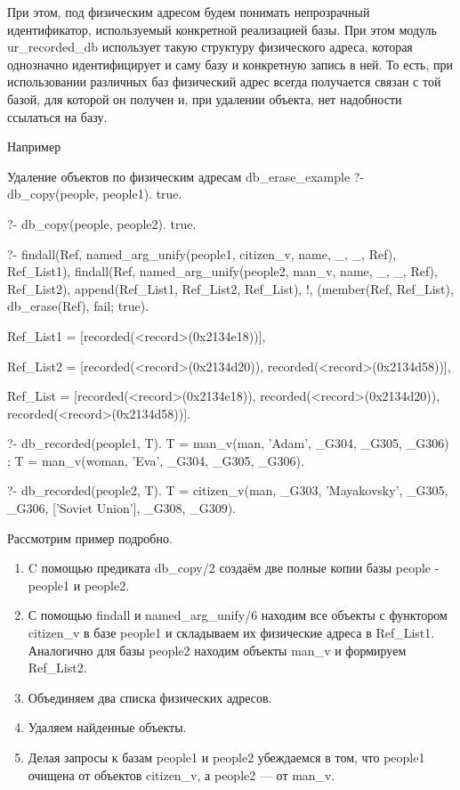 \documentclass[a4paper]{book}
\begin{document}
При этом, под физическим адресом будем понимать непрозрачный
идентификатор, используемый конкретной реализацией базы. При этом
модуль ur\_recorded\_db использует такую структуру физического
адреса, которая однозначно идентифицирует и саму базу и
конкретную запись в ней. То есть, при использовании различных баз
физический адрес всегда получается связан с той базой, для
которой он получен и, при удалении объекта, нет надобности
ссылаться на базу.

Например

\begin{bigexample}{Удаление объектов по физическим адресам}%
               {db_erase_example}
?- db_copy(people, people1).
true.

?- db_copy(people, people2).
true.

?- findall(Ref, 
           named_arg_unify(people1, citizen_v, name, _, _, Ref), 
           Ref_List1), 
   findall(Ref, 
           named_arg_unify(people2, man_v, name, _, _, Ref), 
           Ref_List2), 
   append(Ref_List1, Ref_List2, Ref_List), 
   !, 
   (member(Ref, Ref_List), db_erase(Ref), fail; true).

Ref_List1 = [recorded(<record>(0x2134e18))],

Ref_List2 = [recorded(<record>(0x2134d20)), 
             recorded(<record>(0x2134d58))],

Ref_List = [recorded(<record>(0x2134e18)), 
            recorded(<record>(0x2134d20)), 
            recorded(<record>(0x2134d58))].

?- db_recorded(people1, T).
T = man_v(man, 'Adam', _G304, _G305, _G306) ;
T = man_v(woman, 'Eva', _G304, _G305, _G306).

?- db_recorded(people2, T).                                        
T = citizen_v(man, _G303, 'Mayakovsky', _G305, _G306, 
              ['Soviet Union'], _G308, _G309).
\end{bigexample}

Рассмотрим пример подробно.

\begin{enumerate}
\item C помощью предиката db\_copy/2 создаём две полные копии базы
  people - people1 и people2.
\item С помощью findall и named\_arg\_unify/6 находим все объекты
  с функтором citizen\_v в базе people1 и складываем их
  физические адреса в Ref\_List1. Аналогично для базы people2
  находим объекты man\_v и формируем Ref\_List2.
\item Объединяем два списка физических адресов.
\item Удаляем найденные объекты.
\item Делая запросы к базам people1 и people2 убеждаемся в том,
  что people1 очищена от объектов citizen\_v, а people2 --- от
  man\_v.
\end{enumerate}
\end{document}
